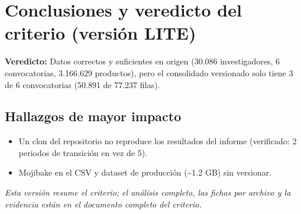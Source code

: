 \section{Conclusiones y veredicto del criterio (versión LITE)}

\begin{tcolorbox}[hallazgo]
\textbf{Veredicto:} Datos correctos y suficientes en origen (30.086 investigadores, 6 convocatorias, 3.166.629 productos), pero el consolidado versionado solo tiene 3 de 6 convocatorias (50.891 de 77.237 filas).

\end{tcolorbox}

\subsection{Hallazgos de mayor impacto}

\begin{itemize}
  \item Un clon del repositorio no reproduce los resultados del informe (verificado: 2 periodos de transición en vez de 5).
  \item Mojibake en el CSV y dataset de producción (\textasciitilde{}1.2 GB) sin versionar.
\end{itemize}

\noindent\textit{Esta versión resume el criterio; el análisis completo, las
fichas por archivo y la evidencia están en el documento completo del criterio.}
